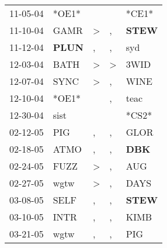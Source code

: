 \begin{supertabular}{p{0.07\textwidth}p{0.06\textwidth}p{0.02\textwidth}p{0.02\textwidth}p{0.06\textwidth}}
          11-05-04\textsuperscript{} &                            *OE1* &                  &                  &                            *CE1* \\
          11-10-04\textsuperscript{} &           GAMR\textsuperscript{} &     \textgreater &                , &  \textbf{STEW\textsuperscript{}} \\
          11-12-04\textsuperscript{} &  \textbf{PLUN\textsuperscript{}} &                , &                , &            syd\textsuperscript{} \\
          12-03-04\textsuperscript{} &           BATH\textsuperscript{} &     \textgreater &     \textgreater &           3WID\textsuperscript{} \\
          12-07-04\textsuperscript{} &           SYNC\textsuperscript{} &     \textgreater &                , &           WINE\textsuperscript{} \\
          12-10-04\textsuperscript{} &                            *OE1* &                  &                , &           teac\textsuperscript{} \\
          12-30-04\textsuperscript{} &           sist\textsuperscript{} &                  &                  &                            *CS2* \\
          02-12-05\textsuperscript{} &            PIG\textsuperscript{} &                , &                , &           GLOR\textsuperscript{} \\
          02-18-05\textsuperscript{} &           ATMO\textsuperscript{} &                , &                , &   \textbf{DBK\textsuperscript{}} \\
          02-24-05\textsuperscript{} &           FUZZ\textsuperscript{} &     \textgreater &                , &            AUG\textsuperscript{} \\
          02-27-05\textsuperscript{} &           wgtw\textsuperscript{} &     \textgreater &                , &           DAYS\textsuperscript{} \\
          03-08-05\textsuperscript{} &           SELF\textsuperscript{} &                , &                , &  \textbf{STEW\textsuperscript{}} \\
          03-10-05\textsuperscript{} &           INTR\textsuperscript{} &                , &                , &           KIMB\textsuperscript{} \\
          03-21-05\textsuperscript{} &           wgtw\textsuperscript{} &                , &                , &            PIG\textsuperscript{} \\

\end{supertabular}
